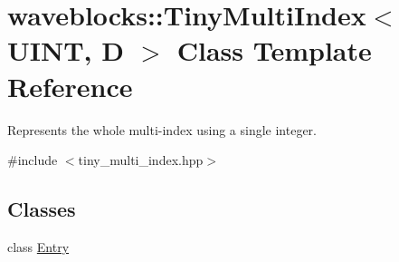 \hypertarget{classwaveblocks_1_1_tiny_multi_index}{}\section{waveblocks\+:\+:Tiny\+Multi\+Index$<$ U\+I\+N\+T, D $>$ Class Template Reference}
\label{classwaveblocks_1_1_tiny_multi_index}


Represents the whole multi-\/index using a single integer.  




{\ttfamily \#include $<$tiny\+\_\+multi\+\_\+index.\+hpp$>$}

\subsection*{Classes}
\begin{DoxyCompactItemize}
\item 
class \hyperlink{classwaveblocks_1_1_tiny_multi_index_1_1_entry}{Entry}
\end{DoxyCompactItemize}
